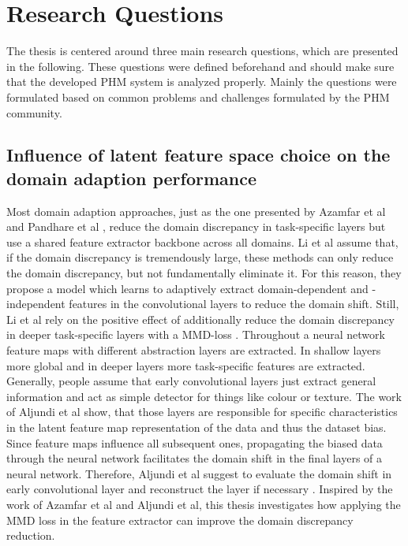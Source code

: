 \section{Research Questions}
The thesis is centered around three main research questions, which are presented in the following. These questions were defined beforehand and should make sure that the developed PHM system is analyzed properly. Mainly the questions were formulated based on common problems and challenges formulated by the PHM community. 

\subsection{Influence of latent feature space choice on the domain adaption performance}
Most domain adaption approaches, just as the one presented by Azamfar et al \cite{AZAMFAR2020103932} and Pandhare et al \cite{Pandhare2021}, reduce the domain discrepancy in task-specific layers but use a shared feature extractor backbone across all domains. Li et al \cite{li2020} assume that, if the domain discrepancy is tremendously large, these methods can only reduce the domain discrepancy, but not fundamentally eliminate it. For this reason, they propose a model which learns to adaptively extract domain-dependent and -independent features in the convolutional layers to reduce the domain shift. Still, Li et al rely on the positive effect of additionally reduce the domain discrepancy in deeper task-specific layers with a MMD-loss \cite{li2020}. Throughout a neural network feature maps with different abstraction layers are extracted. In shallow layers more global and in deeper layers more task-specific features are extracted. Generally, people assume that early convolutional layers just extract general information and act as simple detector for things like colour or texture. The work of Aljundi et al \cite{Aljundi2016} show, that those layers are responsible for specific characteristics in the latent feature map representation of the data and thus the dataset bias. Since feature maps influence all subsequent ones, propagating the biased data through the neural network facilitates the domain shift in the final layers of a neural network. Therefore, Aljundi et al suggest to evaluate the domain shift in early convolutional layer and reconstruct the layer if necessary \cite{Aljundi2016}. Inspired by the work of Azamfar et al and Aljundi et al, this thesis investigates how applying the MMD loss in the feature extractor can improve the domain discrepancy reduction.


